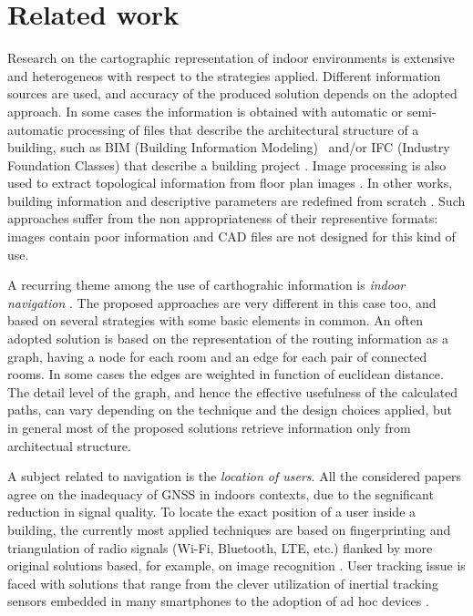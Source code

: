 \section{Related work}\label{related-work}

Research on the cartographic representation of indoor environments is
extensive and heterogeneos with respect to the strategies
applied. Different information sources are used, and accuracy of the
produced solution depends on the adopted approach. In some cases the
information is obtained with automatic or semi-automatic processing of files
that describe the architectural structure of a building, such as BIM (Building Information Modeling)~\cite{Eastman:2008:BHG:1796500} and/or IFC (Industry Foundation Classes) that describe a building project \cite{6816739}. Image processing is also used to
extract topological information from floor plan images \cite{6878152}. In
other works, building information and descriptive parameters are redefined
from scratch \cite{6418876}. Such approaches suffer from the non appropriateness of
their representive formats: images contain poor information and CAD
files are not designed for this kind of use. 

A recurring theme among the use
of carthograhic information is \emph{indoor navigation}
\cite{6878152,6418876,6816739}. The proposed approaches are very different in
this case too, and based on several strategies with some basic elements in
common. An often adopted solution is based on the representation of the
routing information as a graph, having a node for each room and an edge for
each pair of connected rooms. In some cases the edges are weighted in
function of euclidean distance. The detail level of the graph, and hence the
effective usefulness of the calculated paths, can vary depending on the
technique and the design choices applied, but in general most of the proposed
solutions retrieve information only from architectual structure. 

A subject related to navigation is the \emph{location of users}. All the considered papers
agree on the inadequacy of GNSS in indoors contexts, due to the segnificant
reduction in signal quality. To locate the exact position of a user inside a
building, the currently most applied techniques are based on fingerprinting and
triangulation of radio signals (Wi-Fi, Bluetooth, LTE, etc.) flanked by more
original solutions based, for example, on image recognition \cite{6815564}.
User tracking issue is faced with solutions that range from the clever
utilization of inertial tracking sensors embedded in many smartphones
\cite{6815564} to the adoption of ad hoc devices \cite{6878152}.

